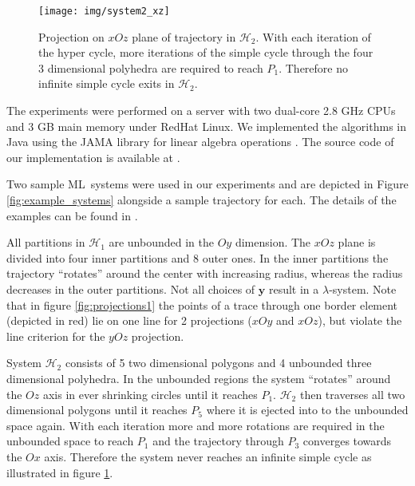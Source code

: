 \documentclass[copyright,creativecommons]{packages/eptcs}
\newcommand{\ml}{\mbox{ML}}
\begin{document}
\begin{figure}[tb]
  \centering
  \texttt{[image: img/system2\_xz]}
  \caption{Projection on $xOz$ plane of trajectory in $\mathcal{H}_2$. With each iteration of the hyper cycle, more iterations of the simple cycle through the four 3 dimensional polyhedra are required to reach $P_1$. Therefore no infinite simple cycle exits in $\mathcal{H}_2$.}
  \label{fig:projections2}
\end{figure}



The  experiments were performed on a server with two dual-core 2.8 GHz CPUs and 3 GB main memory under RedHat Linux. We implemented the algorithms in Java using the JAMA library for linear algebra operations \cite{HetAl00}. 
The source code of our implementation is available at \cite{TF11}.



Two sample \ml~systems were used in our experiments and are depicted in Figure \ref{fig:example_systems} alongside a sample trajectory for each.  The  details of the examples can be found in \cite{TF11-2}.






All partitions in $\mathcal{H}_1$ are unbounded in the $Oy$ dimension. The $xOz$ plane is divided into four inner partitions and 8 outer ones. In the inner partitions the trajectory \enquote{rotates} around the center with increasing radius, whereas the radius decreases in the outer partitions. 
Not all choices of $\mathbf{y}$ result in a $\lambda$-system. Note that in figure \ref{fig:projections1} the points of a trace through one border element (depicted in red) lie on one line for 2 projections ($xOy$ and $xOz$), but violate the line criterion for the $yOz$ projection.



System $\mathcal{H}_2$ consists of 5 two dimensional polygons and 4 unbounded three dimensional polyhedra. In the unbounded regions the system \enquote{rotates} around the $Oz$ axis in ever shrinking circles until it reaches $P_1$. $\mathcal{H}_2$ then traverses all two dimensional polygons until it reaches $P_5$ where it is ejected into to the unbounded space again. With each iteration more and more rotations are required in the unbounded space to reach $P_1$ and the trajectory through $P_3$ converges towards the $Ox$ axis. Therefore the system never reaches an infinite simple cycle as illustrated in figure \ref{fig:projections2}.
\end{document}
